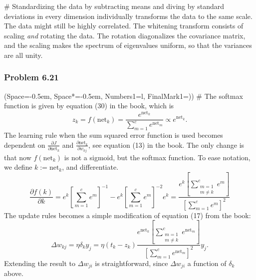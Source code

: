 \documentclass[12pt, a4paper]{article}
\newcommand{\listSpace}{-0.5em}%
\begin{document}
{\begin{easylist}[enumerate]
# Standardizing the data by subtracting means and diving by standard deviations in every dimension individually transforms the data to the same scale.
The data might still be highly correlated.
The whitening transform consists of scaling \emph{and} rotating the data.
The rotation diagonalizes the covariance matrix, and the scaling makes the spectrum of eigenvalues uniform, so that the variances are all unity.




\end{easylist}



\subsubsection*{Problem 6.21}
\begin{easylist}[enumerate]
\ListProperties(Space=\listSpace, Space*=\listSpace, Numbers1=l, FinalMark1={)})
# The softmax function is given by equation (30) in the book, which is
\begin{equation*}
	z_k = f(\text{net}_k) = \frac{e^{\text{net}_k}}{\sum_{m=1}^{c} e^{\text{net}_m}} \propto e^{\text{net}_k}.
\end{equation*}
The learning rule when the sum squared error function is used becomes dependent on $\frac{\partial J}{\partial \text{net}_k}$ and $\frac{\partial \text{net}_k}{\partial w_{kj}}$, see equation (13) in the book.
The only change is that now $f(\text{net}_k)$ is not a sigmoid, but the softmax function.
To ease notation, we define $k := \text{net}_k$, and differentiate.
\begin{equation*}
	\frac{\partial f(k)}{\partial k}
	=
	e^{k} \left[ \sum_{m=1}^{c} e^{m} \right]^{-1}
	-
	e^{k} \left[ \sum_{m=1}^{c} e^{m} \right]^{-2} e^{k}
	=
	\frac{e^{k} \left[ \sum_{\substack{m=1 \\ m \neq k}}^{c} e^{m} \right]}{\left[ \sum_{m=1}^{c} e^{m} \right]^2}
\end{equation*}
The update rules becomes a simple modification of equation (17) from the book:
\begin{equation*}
	\Delta w_{kj} = \eta \delta_k y_j = \eta (t_k - z_k) 
	\frac{e^{\text{net}_k} \left[ \sum_{\substack{m=1 \\ m \neq k}}^{c} e^{\text{net}_m} \right]}{\left[ \sum_{m=1}^{c} e^{\text{net}_m} \right]^2}
	y_j.
\end{equation*}
Extending the result to $\Delta w_{ji}$ is straightforward, since $\Delta w_{ji}$ a function of $\delta_k$ above. 


\end{easylist}}
\end{document}
